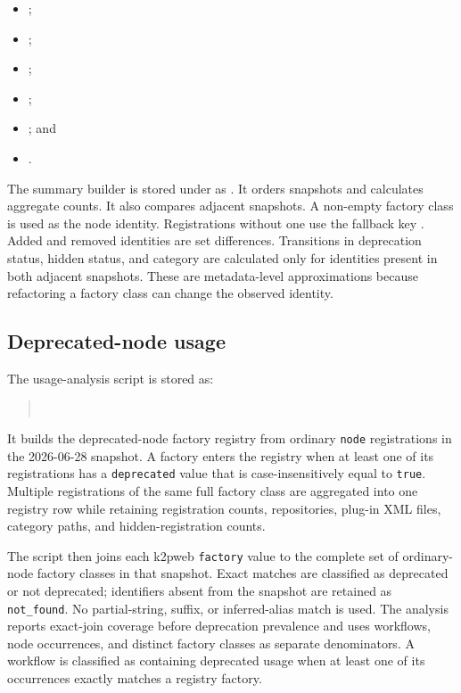 \documentclass[runningheads]{llncs}
\begin{document}
\begin{itemize}
\item {};
\item {};
\item {};
\item {};
\item {}; and
\item {}.
\end{itemize}

The summary builder is stored under  as
. It orders snapshots and calculates
aggregate counts. It also compares adjacent snapshots. A non-empty factory
class is used as the node identity. Registrations without one use the fallback
key . Added and removed identities are
set differences. Transitions in deprecation status, hidden status, and category
are calculated only for identities present in both adjacent snapshots. These are
metadata-level approximations because refactoring a factory class can change
the observed identity.

\subsection{Deprecated-node usage}

The usage-analysis script is stored as:
\begin{quote}
\\
\end{quote}
It builds the deprecated-node factory registry from ordinary \texttt{node}
registrations in the 2026-06-28 snapshot. A factory enters the registry when at
least one of its registrations has a \texttt{deprecated} value that is
case-insensitively equal to \texttt{true}.
Multiple registrations of the same full factory class are aggregated into one
registry row while retaining registration counts, repositories, plug-in XML
files, category paths, and hidden-registration counts.

The script then joins each k2pweb \texttt{factory} value to the complete set of
ordinary-node factory classes in that snapshot. Exact matches are classified as
deprecated or not deprecated; identifiers absent from the snapshot are retained
as \texttt{not\_found}. No partial-string, suffix, or inferred-alias match is used.
The analysis reports exact-join coverage before deprecation prevalence and
uses workflows, node occurrences, and distinct factory classes as
separate denominators. A workflow is classified as containing deprecated usage
when at least one of its occurrences exactly matches a registry factory.
\end{document}
